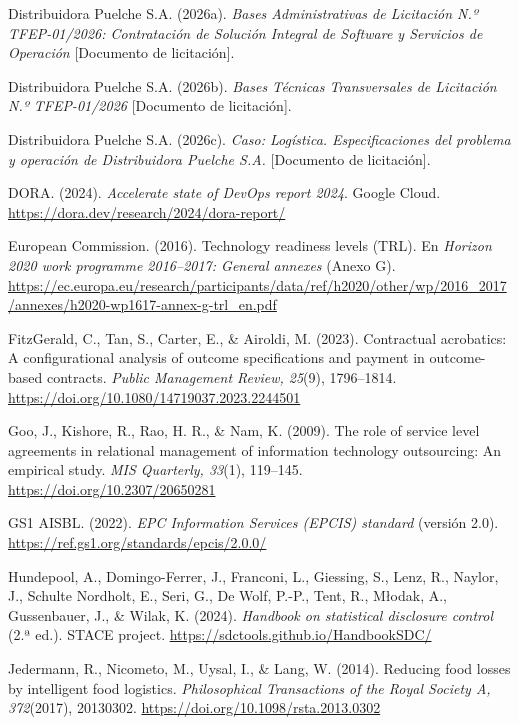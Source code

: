 \begin{list}{}{\setlength{\leftmargin}{1.27cm}\setlength{\itemindent}{-1.27cm}\setlength{\itemsep}{0.4em}\setlength{\parsep}{0pt}}
  \item Distribuidora Puelche S.A. (2026a). \emph{Bases Administrativas de Licitación N.º TFEP-01/2026: Contratación de Solución Integral de Software y Servicios de Operación} [Documento de licitación].
  \item Distribuidora Puelche S.A. (2026b). \emph{Bases Técnicas Transversales de Licitación N.º TFEP-01/2026} [Documento de licitación].
  \item Distribuidora Puelche S.A. (2026c). \emph{Caso: Logística. Especificaciones del problema y operación de Distribuidora Puelche S.A.} [Documento de licitación].
  \item DORA. (2024). \emph{Accelerate state of DevOps report 2024}. Google Cloud. \url{https://dora.dev/research/2024/dora-report/}
  \item European Commission. (2016). Technology readiness levels (TRL). En \emph{Horizon 2020 work programme 2016–2017: General annexes} (Anexo G). \url{https://ec.europa.eu/research/participants/data/ref/h2020/other/wp/2016_2017/annexes/h2020-wp1617-annex-g-trl_en.pdf}
  \item FitzGerald, C., Tan, S., Carter, E., \& Airoldi, M. (2023). Contractual acrobatics: A configurational analysis of outcome specifications and payment in outcome-based contracts. \emph{Public Management Review, 25}(9), 1796–1814. \url{https://doi.org/10.1080/14719037.2023.2244501}
  \item Goo, J., Kishore, R., Rao, H. R., \& Nam, K. (2009). The role of service level agreements in relational management of information technology outsourcing: An empirical study. \emph{MIS Quarterly, 33}(1), 119–145. \url{https://doi.org/10.2307/20650281}
  \item GS1 AISBL. (2022). \emph{EPC Information Services (EPCIS) standard} (versión 2.0). \url{https://ref.gs1.org/standards/epcis/2.0.0/}
  \item Hundepool, A., Domingo-Ferrer, J., Franconi, L., Giessing, S., Lenz, R., Naylor, J., Schulte Nordholt, E., Seri, G., De Wolf, P.-P., Tent, R., Młodak, A., Gussenbauer, J., \& Wilak, K. (2024). \emph{Handbook on statistical disclosure control} (2.ª ed.). STACE project. \url{https://sdctools.github.io/HandbookSDC/}
  \item Jedermann, R., Nicometo, M., Uysal, I., \& Lang, W. (2014). Reducing food losses by intelligent food logistics. \emph{Philosophical Transactions of the Royal Society A, 372}(2017), 20130302. \url{https://doi.org/10.1098/rsta.2013.0302}

\end{list}
